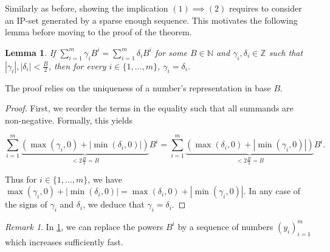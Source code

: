 \documentclass{article}
\theoremstyle{definition}
\theoremstyle{plain}
\newtheorem{lemma}[theorem]{Lemma}
\theoremstyle{remark}
\newtheorem{remark}{Remark}[section]
\newcommand{\N}{\ensuremath{\mathbb{N}}}
\newcommand{\Z}{\ensuremath{\mathbb{Z}}}
\newcommand{\abs}[1]{\left | #1 \right |}
\begin{document}
        Similarly as before, showing the implication $(1) \implies (2)$ requires to consider an IP-set generated by a sparse enough sequence. This motivates the following lemma before moving to the proof of the theorem.
        \begin{lemma}\label{uniqueness B negative}
            If $\sum_{i=1}^{m} \gamma_i B^i = \sum_{i=1}^{m} \delta_i B^i$ for some $B\in \N$ and $\gamma_i, \delta_i \in \Z$ such that $\abs{\gamma_i},\abs{\delta_i} < \frac{B}{2}$, then for every $i \in \{1,\ldots,m\}$, $\gamma_i = \delta_i$.
        \end{lemma}
        The proof relies on the uniqueness of a number's representation in base $B$.
        \begin{proof}
            First, we reorder the terms in the equality such that all summands are non-negative. Formally, this yields

            $$\sum_{i=1}^{m} \underbrace{\left ( \max(\gamma_i,0) + \abs{\min(\delta_i,0) } \right)}_{< 2 \frac{B}{2}= B }  B^i 
            =\sum_{i=1}^{m} \underbrace{ \left ( \max(\delta_i,0) + \abs{\min(\gamma_i,0) } \right)}_{< 2 \frac{B}{2}= B} B^i . $$

            Thus for $i \in \{1,\ldots,m\} $, we have
            $\max(\gamma_i,0) + \abs{\min(\delta_i,0)}  = \max(\delta_i,0) + \abs{\min(\gamma_i,0)}$. In any case of the signs of $\gamma_i$ and $\delta_i$, we deduce that $\gamma_i = \delta_i$.
        \end{proof}
    \begin{remark}\label{sparse_enough}
        In \cref{uniqueness B negative}, we can replace the powers $B^i$ by a sequence of numbers $(y_i)_{i=1}^m$ which increases sufficiently fast.
    \end{remark}
        
\end{document}
